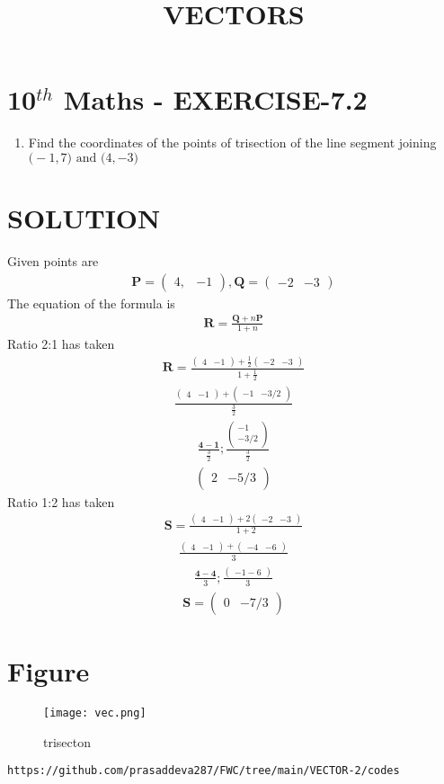 \documentclass[12pt]{article}
\newcommand{\myvec}[1]{\ensuremath{\begin{pmatrix}#1\end{pmatrix}}}
\let\vec\mathbf
\begin{document}
\begin{center}
\title{\textbf{VECTORS}}
\date{\vspace{-5ex}} %
\maketitle
\end{center}

\section{10$^{th}$ Maths - EXERCISE-7.2}

\begin{enumerate}
\item Find the coordinates of the points of trisection of the line segment joining $\vec(-1, 7) \text{ and } \vec(4, -3)$ 
\end{enumerate}

\section{SOLUTION}
Given points are
\begin{align}
\vec{P}=\myvec{4,& -1} ,
\vec{Q}=\myvec{-2& -3}
\end{align}
The equation of the formula is
\begin{align}
\vec{R}=\frac{\vec{Q}+n\vec{P}}{1+n}
\end{align}
Ratio 2:1 has taken 
\begin{align}
\vec{R}=\frac{\myvec{4&-1}+\frac{1}{2}\myvec{-2&-3}}{1+\frac{1}{2}}
\end{align}
\begin{align}
\frac{\myvec{4&-1}+\myvec{-1&-3/2}}{\frac{3}{2}}
\end{align}
\begin{align}
\frac{\vec{4-1}}{\frac{3}{2}};\frac{\myvec{-1\\ -3/2}}{\frac{3}{2}}
\end{align}
\begin{align}
\myvec{2 & -5/3}
\end{align}
Ratio 1:2 has taken
\begin{align}
\vec{S}=\frac{\myvec{4& -1}+2\myvec{-2& -3}}{1+2}
\end{align}
\begin{align}
\frac{\myvec{4& -1}+\myvec{-4& -6}}{3}
\end{align}
\begin{align}
\frac{\vec{4-4}}{3};\frac{\myvec{-1-6}}{3}
\end{align}
\begin{align}
\vec{S}=\myvec{0& -7/3}
\end{align}

\section{Figure}
\begin{figure}[h]
\texttt{[image: vec.png]}
\caption{trisecton}
		\label{fig:Figure}
\end{figure}
\begin{lstlisting}
https://github.com/prasaddeva287/FWC/tree/main/VECTOR-2/codes
\end{lstlisting}
\end{document}
